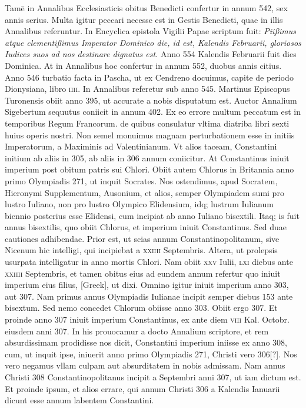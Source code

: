 \begin{parnumbers}
{}
Tamē in Annalibus Ecclesiasticis obitus Benedicti confertur
in annum 542, sex annis serius.
\lnr{}Multa igitur peccari necesse est
in Gestis Benedicti, quae in illis Annalibus referuntur.
\lnr{}In Encyclica
epistola Vigilii Papae scriptum fuit: \textit{Piißimus atque clementißimus
Imperator Dominico die, id est, Kalendis Februarii, gloriosos Iudices suos
ad nos destinare dignatus est.}
\lnr{}Anno 554 Kalendis Februarii fuit dies
Dominica.
\lnr{}At in Annalibus hoc confertur in annum 552, duobus
annis citius.
\lnr{}Anno 546 turbatio facta in Pascha, ut ex Cendreno docuimus,
capite de periodo Dionysiana, libro \textsc{iiii}.
\lnr{}In Annalibus referetur
sub anno 545.
\lnr{}Martinus Episcopus Turonensis obiit anno
395, ut accurate a nobis disputatum est.
\lnr{}Auctor Annalium Sigebertum
sequutus coniicit in annum 402.
\lnr{}Ex eo errore multum peccatum
est in temporibus Regum Francorum.
\lnr{}de quibus consulatur vltima
diatriba libri sexti huius operis nostri.
\lnr{}Non semel monuimus magnam
perturbationem esse in initiis Imperatorum, a Maximinis
ad Valentinianum.
\lnr{}Vt alios taceam, Constantini initium ab aliis in
305, ab aliis in 306 annum coniicitur.
\lnr{}At Constantinus iniuit imperium
post obitum patris sui Chlori.
\lnr{}Obiit autem Chlorus in Britannia
anno primo Olympiadis 271, ut inquit Socrates.
\lnr{}Nos ostendimus,
apud Socratem, Hieronymi Supplementum, Ausonium, et alios,
semper Olympiadem sumi pro lustro Iuliano, non pro lustro Olympico
Elidensium, idq; lustrum Iulianum biennio posterius esse Elidensi,
cum incipiat ab anno Iuliano bisextili.
\lnr{}Itaq; is fuit annus bisextilis,
quo obiit Chlorus, et imperium iniuit Constantinus.
\lnr{}Sed duae
cautiones adhibendae.
\lnr{}Prior est, ut scias annum Constantinopolitanum,
sive Nicenum hic intelligi, qui incipiebat a \textsc{xxiiii} Septembris.
\lnr{}Altera, ut prolepsis usurpata intelligatur in anno mortis Chlori.
\lnr{}Nam obiit \textsc{xxv} Iulii, \textsc{lxi} diebus ante
\textsc{xxiiii} Septembris, et
tamen obitus eius ad eundem annum refertur quo iniuit imperium
eius filius, \textgreek{[Greek]}, ut dixi.
\lnr{}Omnino igitur iniuit imperium anno
303, aut 307.
\lnr{}Nam primus annus Olympiadis Iulianae incipit semper
diebus 153 ante bisextum.
\lnr{}Sed nemo concedet Chlorum obiisse
anno 303.
\lnr{}Obiit ergo 307.
\lnr{}Et proinde anno 307 iniuit imperium
Constantinus, ex ante diem \textsc{viii} Kal. Octobr. eiusdem anni 307.
\lnr{}In his prouocamur a docto Annalium scriptore, et rem absurdissimam
prodidisse nos dicit, Constantini imperium iniisse ex anno
308, cum, ut inquit ipse, iniuerit anno primo Olympiadis 271,
Christi vero 306[?].
\lnr{}Nos vero negamus vllam culpam aut absurditatem
in nobis admissam.
\lnr{}Nam annus Christi 308 Constantinopolitanus
incipit a Septembri anni 307, ut iam dictum est.
\lnr{}Et proinde ipsum, et alios errare, qui annum Christi 306 a Kalendis Ianuarii
dicunt esse annum labentem Constantini.


\end{parnumbers}
